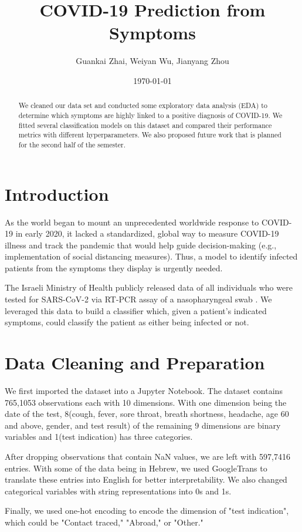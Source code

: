 \documentclass[a4paper]{article}
\title{COVID-19 Prediction from Symptoms}
\author{Guankai Zhai, Weiyan Wu, Jianyang Zhou}
\date{\today} %
\begin{document}
\maketitle

\begin{abstract}
We cleaned our data set and conducted some exploratory data analysis (EDA) to determine which symptoms are highly linked to a positive diagnosis of COVID-19. We fitted several classification models on this dataset and compared their performance metrics with different hyperparameters. We also proposed future work that is planned for the second half of the semester. 
\end{abstract}
\section*{Introduction}
As the world began to mount an unprecedented worldwide response to COVID- 19 in early 2020, it lacked a standardized, global way to measure COVID-19 illness and track the pandemic that would help guide decision-making (e.g., implementation of social distancing measures). Thus, a model to identify infected patients from the symptoms they display is urgently needed. \par
The Israeli Ministry of Health publicly released data of all
individuals who were tested for SARS-CoV-2 via RT-PCR assay of a
nasopharyngeal swab \cite{data}. We leveraged this data to build a classifier which, given a patient's indicated symptoms, could classify the patient as either being infected or not.


\section*{Data Cleaning and Preparation}
We first imported the dataset into a Jupyter Notebook. The dataset contains 765,1053 observations each with 10 dimensions. With one dimension being the date of the test, 8(cough, fever, sore throat, breath shortness, headache, age 60 and above, gender, and test result) of the remaining 9 dimensions are binary variables and 1(test indication) has three categories. \par
After dropping observations that contain NaN values, we are left with 597,7416 entries. With some of the data being in Hebrew, we used GoogleTrans to translate these entries into English for better interpretability. We also changed categorical variables with string representations into 0s and 1s. \par
Finally, we used one-hot encoding to encode the dimension of "test indication", which could be "Contact traced," "Abroad," or "Other."
\end{document}
